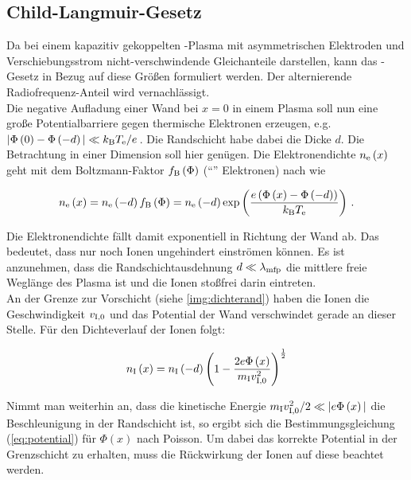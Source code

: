   \subsection{Child-Langmuir-Gesetz} \label{subsub:childlang}

  Da bei einem kapazitiv gekoppelten -Plasma mit asymmetrischen Elektroden  und Verschiebungsstrom nicht-verschwindende Gleichanteile darstellen, kann das -Gesetz in Bezug auf diese Größen formuliert werden. Der alternierende Radiofrequenz-Anteil wird vernachlässigt.\\
  Die negative Aufladung einer Wand bei $x=0$ in einem Plasma soll nun eine große Potentialbarriere gegen thermische Elektronen erzeugen, e.g. $|\Phi\left(0\right)-\Phi\left(-d\right)|\ll k_\text{B}T_\text{e}/e\,$. Die Randschicht habe dabei die Dicke $d$. Die Betrachtung in einer Dimension soll hier genügen. Die Elektronendichte $n_\text{e}\left(x\right)$ geht mit dem Boltzmann-Faktor $f_\text{B}\left(\Phi\right)$ ("`"' Elektronen) nach \cite{Piel10} wie

    \begin{align}
      n_\text{e}\left(x\right)=n_\text{e}\left(-d\right)f_\text{B}\left(\Phi\right)=n_\text{e}\left(-d\right)\exp\left(\frac{e\left(\Phi\left(x\right)-\Phi\left(-d\right)\right)}{k_\text{B}T_\text{e}}\right) \, . \label{eq:randschichtdichte}
    \end{align}

  Die Elektronendichte fällt damit exponentiell in Richtung der Wand ab. Das bedeutet, dass nur noch Ionen ungehindert einströmen können. Es ist anzunehmen, dass die Randschichtausdehnung $d\ll\lambda_\text{mfp}$ die mittlere freie Weglänge des Plasma ist und die Ionen stoßfrei darin eintreten.\\
  An der Grenze zur Vorschicht (siehe \autoref{img:dichterand}) haben die Ionen die Geschwindigkeit $v_\text{I,0}$ und das Potential der Wand verschwindet gerade an dieser Stelle. Für den Dichteverlauf der Ionen folgt:

    \begin{align}
      n_\text{I}\left(x\right)=n_\text{I}\left(-d\right)\left(1-\frac{2e\Phi\left(x\right)}{m_\text{I}v_\text{I,0}^2}\right)^{\frac{1}{2}}
    \end{align}

  Nimmt man weiterhin an, dass die kinetische Energie $m_\text{I}v_\text{I,0}^2/2\ll |e\Phi\left(x\right)|$ die Beschleunigung in der Randschicht ist,  so ergibt sich die Bestimmungsgleichung (\ref{eq:potential}) für $\Phi\left(x\right)$ nach Poisson. Um dabei das korrekte Potential in der Grenzschicht zu erhalten, muss die Rückwirkung der Ionen auf diese beachtet werden.

